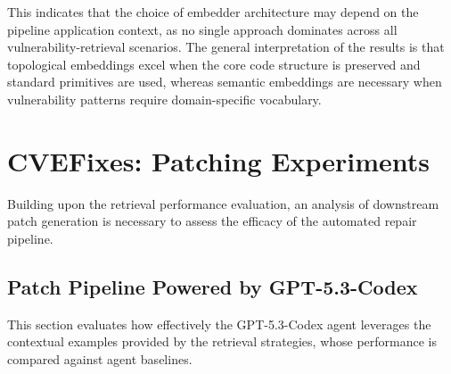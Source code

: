 This indicates that the choice of embedder architecture may depend on the pipeline application context, as no single approach dominates across all vulnerability-retrieval scenarios.
The general interpretation of the results is that topological embeddings excel when the core code structure is preserved and standard primitives are used, whereas semantic embeddings are necessary when vulnerability patterns require domain-specific vocabulary.



\section{CVEFixes: Patching Experiments}
Building upon the retrieval performance evaluation, an analysis of downstream patch generation is necessary to assess the efficacy of the automated repair pipeline.

\subsection{Patch Pipeline Powered by GPT-5.3-Codex}

This section evaluates how effectively the GPT-5.3-Codex agent leverages the contextual examples provided by the retrieval strategies, whose performance is compared against agent baselines.

\begin{table}[H]
  \centering
  \caption{CVEFixes: Overall Pipeline Performance Summary on GPT-5.3-Codex}
  \label{tab:cvefixes_overall_pipeline_performance_gpt_codex}
\end{table}


